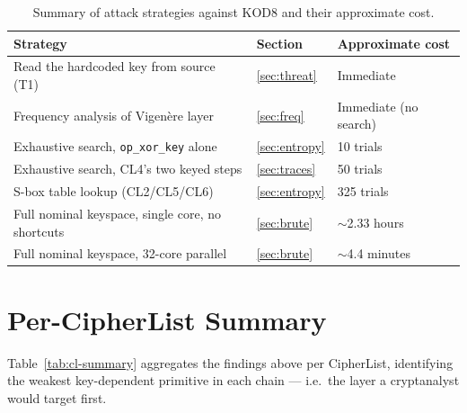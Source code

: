 \documentclass[11pt]{article}
\begin{document}
\begin{table}[h]
\centering
\small
\caption{Summary of attack strategies against KOD8 and their approximate cost.}
\label{tab:complexity}
\begin{tabular}{@{}lll@{}}
\toprule
\textbf{Strategy} & \textbf{Section} & \textbf{Approximate cost} \\
\midrule
Read the hardcoded key from source (T1) & \ref{sec:threat} & Immediate \\
Frequency analysis of Vigen\`ere layer & \ref{sec:freq} & Immediate (no search) \\
Exhaustive search, \texttt{op\_xor\_key} alone & \ref{sec:entropy} & 10 trials \\
Exhaustive search, CL4's two keyed steps & \ref{sec:traces} & 50 trials \\
S-box table lookup (CL2/CL5/CL6) & \ref{sec:entropy} & 325 trials \\
Full nominal keyspace, single core, no shortcuts & \ref{sec:brute} & $\sim$2.33 hours \\
Full nominal keyspace, 32-core parallel & \ref{sec:brute} & $\sim$4.4 minutes \\
\bottomrule
\end{tabular}
\end{table}

\section{Per-CipherList Summary}

Table~\ref{tab:cl-summary} aggregates the findings above per CipherList,
identifying the weakest key-dependent primitive in each chain --- i.e.\
the layer a cryptanalyst would target first.
\end{document}
